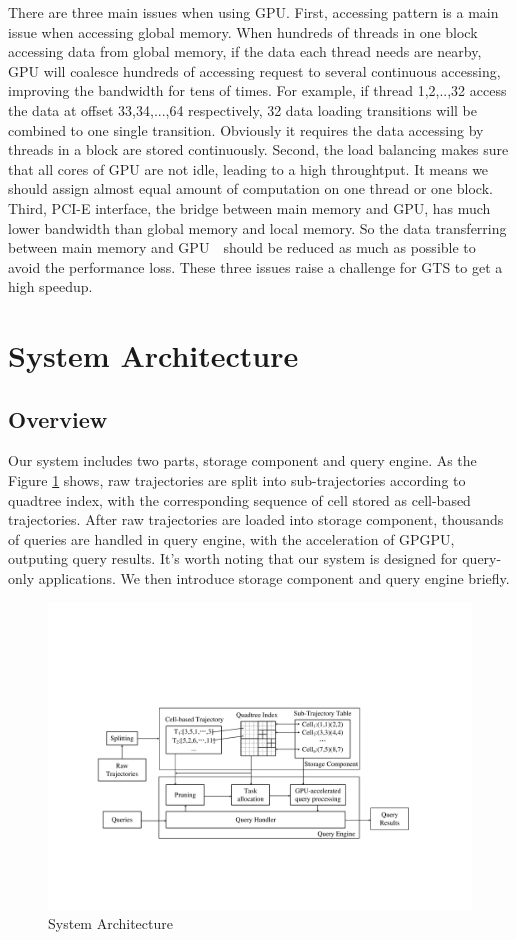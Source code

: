 \documentclass[conference]{IEEEtran}
\begin{document}
There are three main issues when using GPU. First, accessing pattern is a main issue when accessing global memory. When hundreds of threads in one block accessing data from global memory, if the data each thread needs are nearby, GPU will coalesce hundreds of accessing request to several continuous accessing, improving the bandwidth for tens of times. For example, if thread 1,2,..,32 access the data at offset 33,34,...,64 respectively, 32 data loading transitions will be combined to one single transition. Obviously it requires the data accessing by threads in a block are stored continuously. Second, the load balancing makes sure that all cores of GPU are not idle, leading to a high throughtput. It means we should assign almost equal amount of computation on one thread or one block. Third, PCI-E interface, the bridge between main memory and GPU, has much lower bandwidth than global memory and local memory. So the data transferring between main memory and GPU　should be reduced as much as possible to avoid the performance loss. These three issues raise a challenge for GTS to get a high speedup.

\section{System Architecture}

\subsection{Overview}
Our system includes two parts, storage component and query engine. As the Figure \ref{fig:Archi} shows, raw trajectories are split into sub-trajectories according to quadtree index, with the corresponding sequence of cell stored as cell-based trajectories. After raw trajectories are loaded into storage component, thousands of queries are handled in query engine, with the acceleration of GPGPU, outputing query results. It's worth noting that our system is designed for query-only applications. We then introduce storage component and query engine briefly.

\begin{figure}[htbp]\centering
	\includegraphics[width=16cm]{pdf/architecture1.pdf}
	\caption{System Architecture\label{fig:Archi}}
\end{figure}
\end{document}
